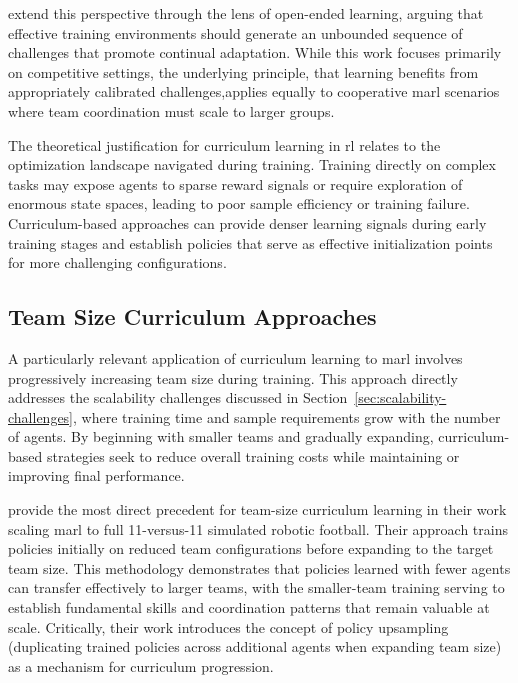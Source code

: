\cite{balduzzi2019} extend this perspective through the lens of 
open-ended learning, arguing that effective training environments should 
generate an unbounded sequence of challenges that promote continual adaptation. 
While this work focuses primarily on competitive settings, 
the underlying principle, that learning benefits from appropriately 
calibrated challenges,applies equally to cooperative \gls{marl} 
scenarios where team coordination must scale to larger groups.

The theoretical justification for curriculum learning in \gls{rl} 
relates to the optimization landscape navigated during training. 
Training directly on complex tasks may expose agents to sparse 
reward signals or require exploration of enormous state spaces, 
leading to poor sample efficiency or training failure. 
Curriculum-based approaches can provide denser learning 
signals during early training stages and establish policies 
that serve as effective initialization points for more 
challenging configurations.

\subsection{Team Size Curriculum Approaches}
\label{subsec:team-size-curriculum}

A particularly relevant application of curriculum learning to \gls{marl} 
involves progressively increasing team size during training. 
This approach directly addresses the scalability challenges 
discussed in Section~\ref{sec:scalability-challenges}, where training 
time and sample requirements grow with the number of agents. 
By beginning with smaller teams and gradually expanding, 
curriculum-based strategies seek to reduce overall training 
costs while maintaining or improving final performance.

\cite{smit2023} provide the most direct precedent for team-size 
curriculum learning in their work scaling \gls{marl} to full 
11-versus-11 simulated robotic football. Their approach trains 
policies initially on reduced team configurations before 
expanding to the target team size. This methodology demonstrates 
that policies learned with fewer agents can transfer effectively 
to larger teams, with the smaller-team training serving to 
establish fundamental skills and coordination patterns that 
remain valuable at scale. Critically, their work introduces 
the concept of policy upsampling (duplicating trained policies 
across additional agents when expanding team size) 
as a mechanism for curriculum progression.

